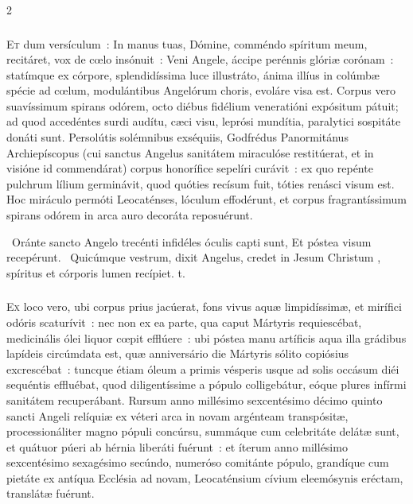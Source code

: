 \documentclass[9pt,twoside]{extarticle}
\begin{document}
\begin{multicols}{2}
{\subsubsection*{\center {}}
\lettrine{E}t dum versículum~: In manus tuas, Dómine, comméndo spíritum meum, recitáret, vox de cœlo insónuit~: Veni Angele, áccipe perénnis glóriæ corónam~: statímque ex córpore, splendidíssima luce illustráto, ánima illíus in colúmbæ spécie ad cœlum, modulántibus Angelórum choris, evoláre visa est. Corpus vero suavíssimum spirans odórem, octo diébus fidélium veneratióni expósitum pátuit; ad quod accedéntes surdi audítu, cæci visu, leprósi mundítia, paralytici sospitáte donáti sunt. Persolútis solémnibus exséquiis, Godfrédus Panormitánus Archiepíscopus (cui sanctus Angelus sanitátem miraculóse restitúerat, et in visióne id commendárat) corpus honorífice sepelíri curávit~: ex quo repénte pulchrum lílium germinávit, quod quóties recísum fuit, tóties renásci visum est. Hoc miráculo permóti Leocaténses, lóculum effodérunt, et corpus fragrantíssimum spirans odórem in arca auro decoráta reposuérunt.

\begin{tightlist}{}
\item {}~Oránte sancto Angelo trecénti infidéles óculis capti sunt, \textred{*} Et póstea visum recepérunt.
~Quicúmque vestrum, dixit Angelus, credet in Jesum Christum , spíritus et córporis lumen recípiet. t.
\end{tightlist}

\subsubsection*{\center {}}
\lettrine{E}x loco vero, ubi corpus prius jacúerat, fons vivus aquæ limpidíssimæ, et mirífici odóris scaturívit~: nec non ex ea parte, qua caput Mártyris requiescébat, medicinális ólei liquor cœpit efflúere~: ubi póstea manu artíficis aqua illa grádibus lapídeis circúmdata est, quæ anniversário die Mártyris sólito copiósius excrescébat~: tuncque étiam óleum a primis vésperis usque ad solis occásum diéi sequéntis effluébat, quod diligentíssime a pópulo colligebátur, eóque plures infírmi sanitátem recuperábant. Rursum anno millésimo sexcentésimo décimo quinto sancti Angeli relíquiæ ex véteri arca in novam argénteam transpósitæ, processionáliter magno pópuli concúrsu, summáque cum celebritáte delátæ sunt, et quátuor púeri ab hérnia liberáti fuérunt~: et íterum anno millésimo sexcentésimo sexagésimo secúndo, numeróso comitánte pópulo, grandíque cum pietáte ex antíqua Ecclésia ad novam, Leocaténsium cívium eleemósynis eréctam, translátæ fuérunt.

}
\end{multicols}
\end{document}

